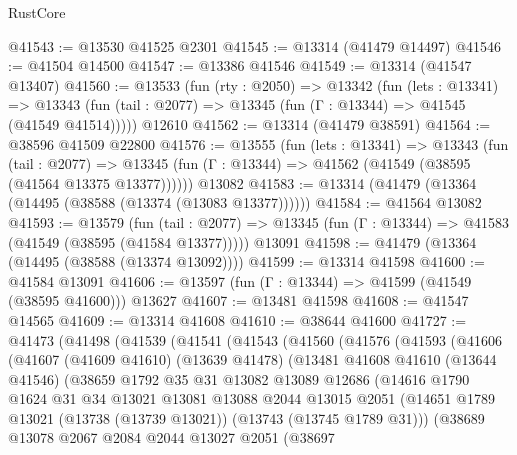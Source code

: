 \begin{lexlean}{RustCore}
\begin{coremodule}
@41543 := @13530 @41525 @2301
@41545 := @13314 (@41479 @14497)
@41546 := @41504 @14500
@41547 := @13386 @41546
@41549 := @13314 (@41547 @13407)
@41560 := @13533
    (fun (rty : @2050) =>
    @13342
      (fun (lets : @13341) =>
      @13343 (fun (tail : @2077) => @13345 (fun (Γ : @13344) => @41545 (@41549 @41514)))))
    @12610
@41562 := @13314 (@41479 @38591)
@41564 := @38596 @41509 @22800
@41576 := @13555
    (fun (lets : @13341) =>
    @13343
      (fun (tail : @2077) =>
      @13345 (fun (Γ : @13344) => @41562 (@41549 (@38595 (@41564 @13375 @13377))))))
    @13082
@41583 := @13314 (@41479 (@13364 (@14495 (@38588 (@13374 (@13083 @13377))))))
@41584 := @41564 @13082
@41593 := @13579
    (fun (tail : @2077) => @13345 (fun (Γ : @13344) => @41583 (@41549 (@38595 (@41584 @13377)))))
    @13091
@41598 := @41479 (@13364 (@14495 (@38588 (@13374 @13092))))
@41599 := @13314 @41598
@41600 := @41584 @13091
@41606 := @13597 (fun (Γ : @13344) => @41599 (@41549 (@38595 @41600))) @13627
@41607 := @13481 @41598
@41608 := @41547 @14565
@41609 := @13314 @41608
@41610 := @38644 @41600
@41727 := @41473
    (@41498
      (@41539
        (@41541
          (@41543
            (@41560
              (@41576
                (@41593
                  (@41606
                    (@41607
                      (@41609 @41610)
                      (@13639 @41478)
                      (@13481
                        @41608
                        @41610
                        (@13644 @41546)
                        (@38659
                          @1792
                          @35
                          @31
                          @13082
                          @13089
                          @12686
                          (@14616
                            @1790
                            @1624
                            @31
                            @34
                            @13021
                            @13081
                            @13088
                            @2044
                            @13015
                            @2051
                            (@14651
                              @1789
                              @13021
                              (@13738 (@13739 @13021))
                              (@13743 (@13745 @1789 @31)))
                            (@38689
                              @13078
                              @2067
                              @2084
                              @2044
                              @13027
                              @2051
                              (@38697

\end{coremodule}
\end{lexlean}
